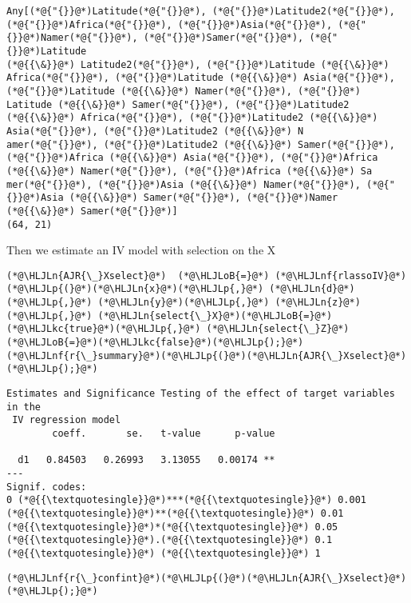 \documentclass[12pt,a4paper]{article}
\newcommand{\HLJLkc}[1]{\textcolor[RGB]{59,151,46}{\textit{#1}}}
\newcommand{\HLJLn}[1]{#1}
\newcommand{\HLJLnf}[1]{\textcolor[RGB]{66,102,213}{#1}}
\newcommand{\HLJLoB}[1]{\textcolor[RGB]{102,102,102}{\textbf{#1}}}
\newcommand{\HLJLp}[1]{#1}
\begin{document}
\begin{lstlisting}
Any[(*@{"{}}@*)Latitude(*@{"{}}@*), (*@{"{}}@*)Latitude2(*@{"{}}@*), (*@{"{}}@*)Africa(*@{"{}}@*), (*@{"{}}@*)Asia(*@{"{}}@*), (*@{"{}}@*)Namer(*@{"{}}@*), (*@{"{}}@*)Samer(*@{"{}}@*), (*@{"{}}@*)Latitude 
(*@{{\&}}@*) Latitude2(*@{"{}}@*), (*@{"{}}@*)Latitude (*@{{\&}}@*) Africa(*@{"{}}@*), (*@{"{}}@*)Latitude (*@{{\&}}@*) Asia(*@{"{}}@*), (*@{"{}}@*)Latitude (*@{{\&}}@*) Namer(*@{"{}}@*), (*@{"{}}@*)
Latitude (*@{{\&}}@*) Samer(*@{"{}}@*), (*@{"{}}@*)Latitude2 (*@{{\&}}@*) Africa(*@{"{}}@*), (*@{"{}}@*)Latitude2 (*@{{\&}}@*) Asia(*@{"{}}@*), (*@{"{}}@*)Latitude2 (*@{{\&}}@*) N
amer(*@{"{}}@*), (*@{"{}}@*)Latitude2 (*@{{\&}}@*) Samer(*@{"{}}@*), (*@{"{}}@*)Africa (*@{{\&}}@*) Asia(*@{"{}}@*), (*@{"{}}@*)Africa (*@{{\&}}@*) Namer(*@{"{}}@*), (*@{"{}}@*)Africa (*@{{\&}}@*) Sa
mer(*@{"{}}@*), (*@{"{}}@*)Asia (*@{{\&}}@*) Namer(*@{"{}}@*), (*@{"{}}@*)Asia (*@{{\&}}@*) Samer(*@{"{}}@*), (*@{"{}}@*)Namer (*@{{\&}}@*) Samer(*@{"{}}@*)]
(64, 21)
\end{lstlisting}


Then we estimate an IV model with selection on the X


\begin{lstlisting}
(*@\HLJLn{AJR{\_}Xselect}@*)  (*@\HLJLoB{=}@*) (*@\HLJLnf{rlassoIV}@*)(*@\HLJLp{(}@*)(*@\HLJLn{x}@*)(*@\HLJLp{,}@*) (*@\HLJLn{d}@*)(*@\HLJLp{,}@*) (*@\HLJLn{y}@*)(*@\HLJLp{,}@*) (*@\HLJLn{z}@*)(*@\HLJLp{,}@*) (*@\HLJLn{select{\_}X}@*)(*@\HLJLoB{=}@*)(*@\HLJLkc{true}@*)(*@\HLJLp{,}@*) (*@\HLJLn{select{\_}Z}@*)(*@\HLJLoB{=}@*)(*@\HLJLkc{false}@*)(*@\HLJLp{);}@*)
(*@\HLJLnf{r{\_}summary}@*)(*@\HLJLp{(}@*)(*@\HLJLn{AJR{\_}Xselect}@*)(*@\HLJLp{);}@*)
\end{lstlisting}

\begin{lstlisting}
Estimates and Significance Testing of the effect of target variables in the
 IV regression model
        coeff.       se.   t-value      p-value

  d1   0.84503   0.26993   3.13055   0.00174 **
---
Signif. codes:
0 (*@{{\textquotesingle}}@*)***(*@{{\textquotesingle}}@*) 0.001 (*@{{\textquotesingle}}@*)**(*@{{\textquotesingle}}@*) 0.01 (*@{{\textquotesingle}}@*)*(*@{{\textquotesingle}}@*) 0.05 (*@{{\textquotesingle}}@*).(*@{{\textquotesingle}}@*) 0.1 (*@{{\textquotesingle}}@*) (*@{{\textquotesingle}}@*) 1
\end{lstlisting}


\begin{lstlisting}
(*@\HLJLnf{r{\_}confint}@*)(*@\HLJLp{(}@*)(*@\HLJLn{AJR{\_}Xselect}@*)(*@\HLJLp{);}@*)
\end{lstlisting}
\end{document}
